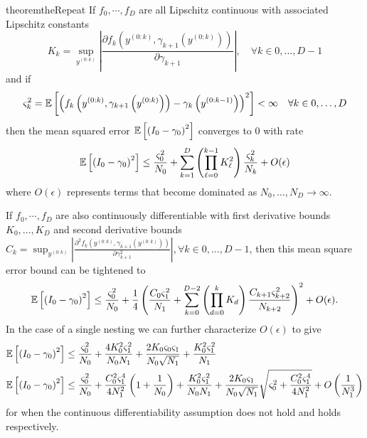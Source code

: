\begin{restatable}{theorem}{theRepeat}
	\label{the:Repeat} %
	If $f_0, \cdots, f_D$ are all Lipschitz continuous with associated Lipschitz 
	constants
	\[K_k = \sup_{y^{(0:k)}} \left| \frac{\partial f_k\left(y^{(0:k)},\gamma_{k+1}(y^{(0:k)})\right)}{\partial \gamma_{k+1}}\right|, \quad \forall k
	\in 0,\dots,D-1
	\]
	and if
	\[
	\varsigma_{k}^2  
	=\mathbb{E} \left[\left(f_k\left(y^{(0:k)},\gamma_{k+1}
	\left(y^{(0:k)}\right) \right)-\gamma_k\left(y^{(0:k-1)}\right)\right)^2\right] < \infty \quad \forall k\in 0,\dots,D
	\]
	then the mean squared error $\mathbb{E} \left[\left(I_0 - \gamma_0\right)^2\right] $ converges to $0$ with rate
	\begin{align}
	\label{eq:bound-lip}
	\mathbb{E} \left[\left(I_0 - \gamma_0\right)^2\right] \le
	\frac{\varsigma_{0}^2}{N_0} +
	\sum_{k=1}^{D} \left(\prod_{\ell=0}^{k-1} K_{\ell}^2\right)
	\frac{\varsigma_{k}^2}{N_{k}}+ O(\epsilon)
	\end{align}
	where $O(\epsilon)$ represents terms that become dominated as $N_0,\dots,N_D
	\rightarrow \infty$.
	
	If $f_0, \cdots, f_D$ are also continuously differentiable with first derivative bounds
	$K_0, \dots, K_D$ and second derivative bounds 
	$C_k = \sup_{y^{(0:k)}} \left|\frac{\partial^2 f_k\left(y^{(0:k)},\gamma_{k+1}(y^{(0:k)})\right)}{\partial \gamma^2_{k+1}}\right|, \forall k
	\in 0,\dots,D-1$, then this mean square error bound can be tightened to
	\begin{align}
	\label{eq:bound-cont}
	\mathbb{E} \left[\left(I_0 - \gamma_0\right)^2\right] \le 
	\frac{\varsigma_0^2}{N_0}
	+\frac{1}{4}\left(
	\frac{C_0 \varsigma_{1}^2}{N_{1}}
	+\sum_{k=0}^{D-2}  \left(\prod_{d=0}^{k} K_{d}\right)
	\frac{C_{k+1} \varsigma^2_{k+2}}{N_{k+2}}
	\right)^2 + O(\epsilon).
	\end{align}
	In the case of a single nesting we can further characterize $O(\epsilon)$ to give
	\begin{align}
	\mathbb{E} \left[\left(I_0 - \gamma_0\right)^2\right] &\le \frac{\varsigma^2_0}{N_0}+\frac{4 K_{0}^2 \varsigma_1^2}{N_0 N_{1}}
	+\frac{2 K_{0}\varsigma_{0} \varsigma_1}{N_{0} \sqrt{N_1}}+\frac{K_0 ^2 \varsigma_1^2}{N_1} \\
	\mathbb{E} \left[\left(I_0 - \gamma_0\right)^2\right]  &\le \frac{\varsigma^2_0}{N_0}+\frac{C_0 ^2 \varsigma_1^4}{4 N_1^2}\left(1+\frac{1}{N_0}\right)
	+\frac{K_{0}^2 \varsigma_1^2}{N_0 N_{1}}
	+\frac{2 K_{0}\varsigma_1}{N_{0} \sqrt{N_1}}\sqrt{\varsigma_0^2+\frac{C_0 ^2 \varsigma_1^4}{4 N_1^2}}
	+ O\left(\frac{1}{N_1^3}\right)
	\label{eq:cont-single}
	\end{align}
	for when the continuous differentiability assumption does not hold and 
	holds respectively.
\end{restatable}
